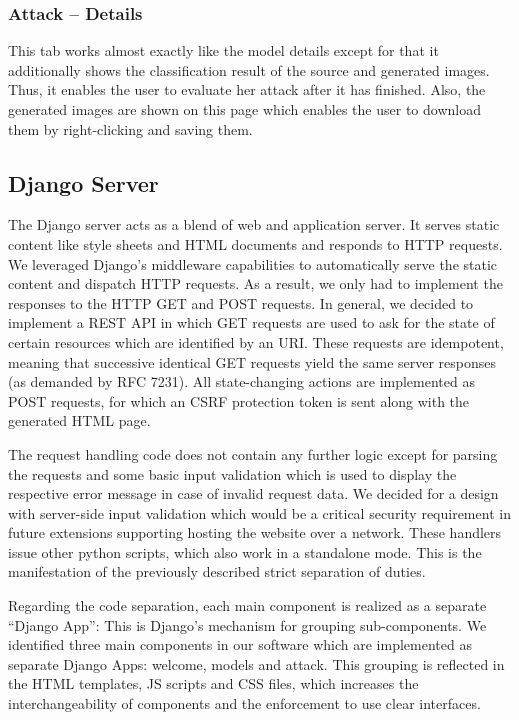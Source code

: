 \subsubsection{Attack -- Details}
This tab works almost exactly like the model details except for that it additionally shows the classification result of the source and generated images.
Thus, it enables the user to evaluate her attack after it has finished.
Also, the generated images are shown on this page which enables the user to download them by right-clicking and saving them.

\subsection{Django Server}\label{subsec:webserver}
The Django server acts as a blend of web and application server.
It serves static content like style sheets and HTML documents and responds to HTTP requests.
We leveraged Django's middleware capabilities to automatically serve the static content and dispatch HTTP requests.
As a result, we only had to implement the responses to the HTTP GET and POST requests.
In general, we decided to implement a REST API in which GET requests are used to ask for the state of certain resources which are identified by an URI.
These requests are idempotent, meaning that successive identical GET requests yield the same server responses (as demanded by RFC 7231\cite{rfc7231}).
All state-changing actions are implemented as POST requests, for which an CSRF protection token is sent along with the generated HTML page.

The request handling code does not contain any further logic except for parsing the requests and some basic input validation which is used to display the respective error message in case of invalid request data.
We decided for a design with server-side input validation which would be a critical security requirement in future extensions supporting hosting the website over a network.
These handlers issue other python scripts, which also work in a standalone mode.
This is the manifestation of the previously described strict separation of duties.

Regarding the code separation, each main component is realized as a separate \enquote{Django App}: This is Django's mechanism for grouping sub-components.
We identified three main components in our software which are implemented as separate Django Apps: welcome, models and attack.
This grouping is reflected in the HTML templates, JS scripts and CSS files, which increases the interchangeability of components and the enforcement to use clear interfaces.


